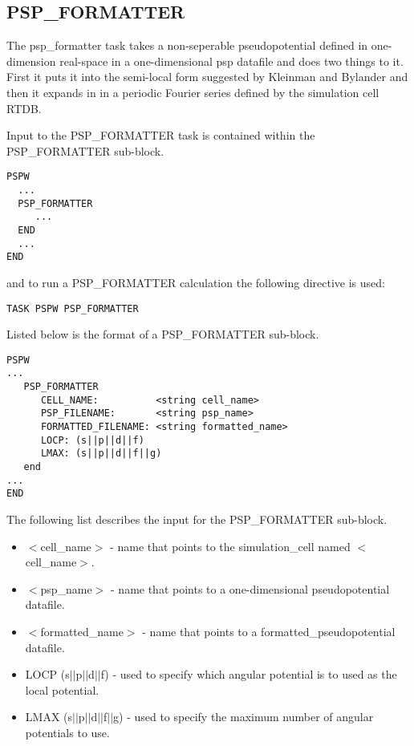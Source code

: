 \subsection{PSP\_FORMATTER}
The psp\_formatter task takes a non-seperable pseudopotential defined in
one-dimension real-space in a one-dimensional psp datafile and does two 
things to it.  First it puts it into the semi-local form suggested by 
Kleinman and Bylander and then it expands in in a periodic Fourier
series defined by the simulation cell RTDB.  

Input to the PSP\_FORMATTER task is contained
within the PSP\_FORMATTER sub-block.
\begin{verbatim}
PSPW
  ...
  PSP_FORMATTER
     ...
  END
  ...
END
\end{verbatim}
and to run a PSP\_FORMATTER calculation the following directive is used:
\begin{verbatim}
TASK PSPW PSP_FORMATTER
\end{verbatim}
Listed below is the format of a PSP\_FORMATTER sub-block.
\begin{verbatim}
PSPW
... 
   PSP_FORMATTER
      CELL_NAME:          <string cell_name> 
      PSP_FILENAME:       <string psp_name>
      FORMATTED_FILENAME: <string formatted_name>
      LOCP: (s||p||d||f)
      LMAX: (s||p||d||f||g)
   end
...
END
\end{verbatim}
The following list describes the input for the PSP\_FORMATTER
sub-block.
\begin{itemize}
	\item $<$cell\_name$>$ - name that points 
		to the simulation\_cell named $<$cell\_name$>$.
	\item $<$psp\_name$>$ - name that points
              to a one-dimensional pseudopotential datafile.
	\item $<$formatted\_name$>$ -  
 	      name that points to a formatted\_pseudopotential datafile.
  	\item LOCP (s$||$p$||$d$||$f) - used to specify which angular potential
	      is to used as the local potential.
        \item LMAX (s$||$p$||$d$||$f$||$g) - used to specify the maximum number
              of angular potentials to use.
\end{itemize}


